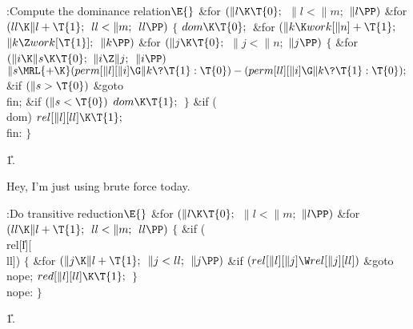 \Y\B\4:Compute the dominance relation\X${}\E{}$\6
\&{for} ${}(\|l\K\T{0};{}$ ${}\|l<\|m;{}$ ${}\|l\PP){}$\1\6
\&{for} ${}(\\{ll}\K\|l+\T{1};{}$ ${}\\{ll}<\|m;{}$ ${}\\{ll}\PP){}$\5
${}\{{}$\1\6
${}\\{dom}\K\T{0};{}$\6
\&{for} ${}(\|k\K\\{work}[\|n]+\T{1};{}$ ${}\|k\Z\\{work}[\T{1}];{}$ ${}\|k%
\PP){}$\1\6
\&{for} ${}(\|j\K\T{0};{}$ ${}\|j<\|n;{}$ ${}\|j\PP){}$\5
${}\{{}$\1\6
\&{for} ${}(\|i\K\|s\K\T{0};{}$ ${}\|i\Z\|j;{}$ ${}\|i\PP){}$\1\5
${}\|s\MRL{+{\K}}(\\{perm}[\|l][\|i]\G\|k\?\T{1}:\T{0})-(\\{perm}[\\{ll}][\|i]%
\G\|k\?\T{1}:\T{0});{}$\2\6
\&{if} ${}(\|s>\T{0}){}$\1\5
\&{goto} \\{fin};\2\6
\&{if} ${}(\|s<\T{0}){}$\1\5
${}\\{dom}\K\T{1};{}$\2\6
\4${}\}{}$\2\2\6
\&{if} (\\{dom})\1\5
${}\\{rel}[\|l][\\{ll}]\K\T{1};{}$\2\6
\4\\{fin}:\6
\4${}\}{}$\2\2\par
\U1.\fi

Hey, I'm just using brute force today.

\Y\B\4:Do transitive reduction\X${}\E{}$\6
\&{for} ${}(\|l\K\T{0};{}$ ${}\|l<\|m;{}$ ${}\|l\PP){}$\1\6
\&{for} ${}(\\{ll}\K\|l+\T{1};{}$ ${}\\{ll}<\|m;{}$ ${}\\{ll}\PP){}$\5
${}\{{}$\1\6
\&{if} (\\{rel}[\|l][\\{ll}])\5
${}\{{}$\1\6
\&{for} ${}(\|j\K\|l+\T{1};{}$ ${}\|j<\\{ll};{}$ ${}\|j\PP){}$\1\6
\&{if} ${}(\\{rel}[\|l][\|j]\W\\{rel}[\|j][\\{ll}]){}$\1\5
\&{goto} \\{nope};\2\2\6
${}\\{red}[\|l][\\{ll}]\K\T{1};{}$\6
\4${}\}{}$\2\6
\4\\{nope}:\6
\4${}\}{}$\2\2\par
\U1.\fi


